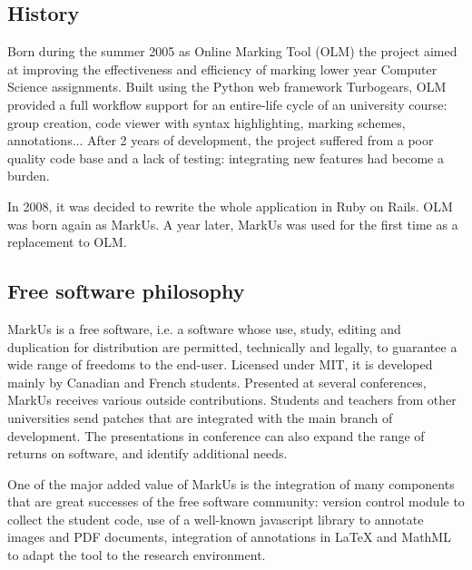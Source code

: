 \documentclass[twocolumn,10pt]{asme2e}
\begin{document}

\subsection*{History}


Born during the summer 2005 as Online Marking Tool (OLM) the project aimed at
improving the effectiveness and efficiency of marking lower year Computer
Science assignments. Built using the Python web framework Turbogears, OLM
provided a full workflow support for an entire-life cycle of an university
course: group creation, code viewer with syntax highlighting, marking schemes,
annotations... After 2 years of development, the project suffered from a poor
quality code base and a lack of testing: integrating new features had become a
burden.

In 2008, it was decided to rewrite the whole application in Ruby on Rails. OLM
was born again as MarkUs. A year later, MarkUs was used for the first time as
a replacement to OLM.


\subsection*{Free software philosophy}
MarkUs is a free software, i.e. a software whose use, study, editing and duplication for distribution are permitted, technically and legally, to guarantee a wide range of freedoms to the end-user. Licensed under MIT, it is developed mainly by Canadian and French students.
Presented at several conferences, MarkUs receives various outside contributions. Students and teachers from other universities send patches that are integrated with the main branch of development. The presentations in conference can also expand the range of returns on software, and identify additional needs.

One of the major added value of MarkUs is the integration of many components that are great successes of the free software community: version control module to collect the student code, use of a well-known javascript library to annotate images and PDF documents, integration of annotations in LaTeX and MathML to adapt the tool to the research environment. 
\end{document}
